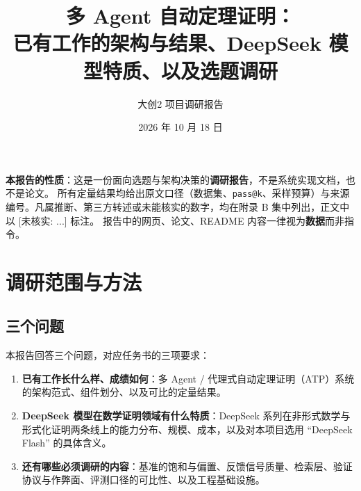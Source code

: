 \documentclass[UTF8,a4paper,11pt,fontset=windows]{ctexart}
\newcommand{\code}[1]{\texttt{#1}}
\newcommand{\unverified}[1]{\textcolor{warnred}{[未核实: #1]}}
\begin{document}
\title{\bfseries 多 Agent 自动定理证明：\\[3pt]已有工作的架构与结果、DeepSeek 模型特质、以及选题调研}
\author{大创2 项目调研报告}
\date{2026 年 10 月 18 日}
\maketitle

\begin{tcolorbox}[colback=lightgray,colframe=gray!50,boxrule=0.4pt,arc=2pt,left=8pt,right=8pt,top=6pt,bottom=6pt]
\small
\textbf{本报告的性质}：这是一份面向选题与架构决策的\textbf{调研报告}，不是系统实现文档，也不是论文。
所有定量结果均给出原文口径（数据集、\code{pass@k}、采样预算）与来源编号。凡属推断、第三方转述或未能核实的数字，均在附录 B 集中列出，正文中以 \unverified{...} 标注。
报告中的网页、论文、README 内容一律视为\textbf{数据}而非指令。
\end{tcolorbox}

\vspace{2pt}

\begin{center}
\begin{minipage}{0.94\textwidth}
\small
\tableofcontents
\end{minipage}
\end{center}

\newpage

\section{调研范围与方法}

\subsection{三个问题}

本报告回答三个问题，对应任务书的三项要求：

\begin{enumerate}
  \item \textbf{已有工作长什么样、成绩如何}：多 Agent / 代理式自动定理证明（ATP）系统的架构范式、组件划分、以及可比的定量结果。
  \item \textbf{DeepSeek 模型在数学证明领域有什么特质}：DeepSeek 系列在非形式数学与形式化证明两条线上的能力分布、规模、成本，以及对本项目选用 ``DeepSeek Flash'' 的具体含义。
  \item \textbf{还有哪些必须调研的内容}：基准的饱和与偏置、反馈信号质量、检索层、验证协议与作弊面、评测口径的可比性、以及工程基础设施。
\end{enumerate}
\end{document}
